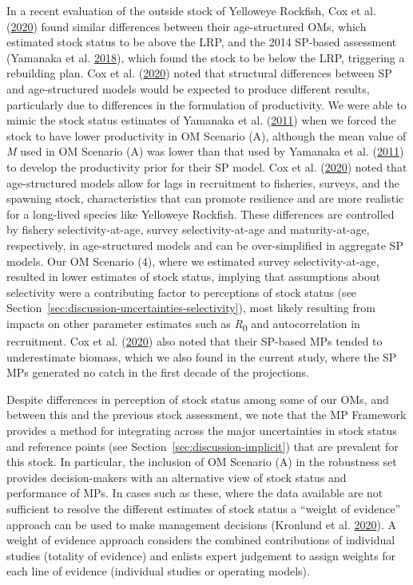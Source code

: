\documentclass[11pt]{book}
\begin{document}
In a recent evaluation of the outside stock of Yelloweye Rockfish, Cox et al. (\protect\hyperlink{ref-cox2020}{2020}) found similar differences between their age-structured OMs, which estimated stock status to be above the LRP, and the 2014 SP-based assessment (Yamanaka et al. \protect\hyperlink{ref-yamanaka2018yelloweyeoutside}{2018}), which found the stock to be below the LRP, triggering a rebuilding plan. Cox et al. (\protect\hyperlink{ref-cox2020}{2020}) noted that structural differences between SP and age-structured models would be expected to produce different results, particularly due to differences in the formulation of productivity. We were able to mimic the stock status estimates of Yamanaka et al. (\protect\hyperlink{ref-yamanaka2011}{2011}) when we forced the stock to have lower productivity in OM Scenario (A), although the mean value of \emph{M} used in OM Scenario (A) was lower than that used by Yamanaka et al. (\protect\hyperlink{ref-yamanaka2011}{2011}) to develop the productivity prior for their SP model. Cox et al. (\protect\hyperlink{ref-cox2020}{2020}) noted that age-structured models allow for lags in recruitment to fisheries, surveys, and the spawning stock, characteristics that can promote resilience and are more realistic for a long-lived species like Yelloweye Rockfish. These differences are controlled by fishery selectivity-at-age, survey selectivity-at-age and maturity-at-age, respectively, in age-structured models and can be over-simplified in aggregate SP models. Our OM Scenario (4), where we estimated survey selectivity-at-age, resulted in lower estimates of stock status, implying that assumptions about selectivity were a contributing factor to perceptions of stock status (see Section~\ref{sec:discussion-uncertainties-selectivity}), most likely resulting from impacts on other parameter estimates such as \emph{R}\textsubscript{0} and autocorrelation in recruitment. Cox et al. (\protect\hyperlink{ref-cox2020}{2020}) also noted that their SP-based MPs tended to underestimate biomass, which we also found in the current study, where the SP MPs generated no catch in the first decade of the projections.

Despite differences in perception of stock status among some of our OMs, and between this and the previous stock assessment, we note that the MP Framework provides a method for integrating across the major uncertainties in stock status and reference points (see Section~\ref{sec:discussion-implicit}) that are prevalent for this stock. In particular, the inclusion of OM Scenario (A) in the robustness set provides decision-makers with an alternative view of stock status and performance of MPs. In cases such as these, where the data available are not sufficient to resolve the different estimates of stock status a ``weight of evidence'' approach can be used to make management decisions (Kronlund et al. \protect\hyperlink{ref-kronlund2020}{2020}). A weight of evidence approach considers the combined contributions of individual studies (totality of evidence) and enlists expert judgement to assign weights for each line of evidence (individual studies or operating models).
\end{document}
